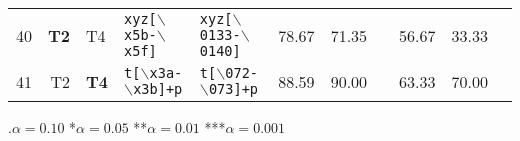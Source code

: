 \begin{table*}[ht]
\begin{tabular}{p{0.3cm}r@{ -- }lp{4cm}p{4cm}|p{0.8cm}p{0.8cm}p{0.6cm}|p{0.99cm}p{0.99cm}p{0.6cm}}
  40 & {\bf T2} & T4 & {\tt xyz[$\backslash$x5b-$\backslash$x5f]} & {\tt xyz[$\backslash$0133-$\backslash$0140]} & 78.67 & 71.35 &   & 56.67 & 33.33 &   \\ 
  41 & T2 & {\bf T4} & {\tt t[$\backslash$x3a-$\backslash$x3b]+p} & {\tt t[$\backslash$072-$\backslash$073]+p} & 88.59 & 90.00 &   & 63.33 & 70.00 &   \\ 
   \hline
\end{tabular}

\vspace{3pt}
.$\alpha = 0.10$ \hspace{3pt} *$\alpha=0.05$ \hspace{3pt} **$\alpha=0.01$ \hspace{3pt} ***$\alpha=0.001$
\end{table*}
